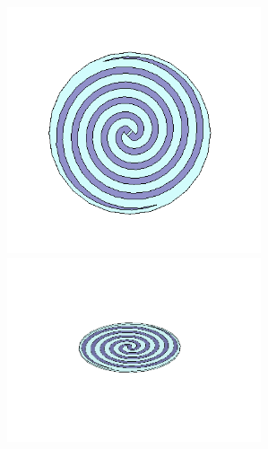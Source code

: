 \documentclass[11pt,a4paper,uplatex]{ujarticle}
\begin{document}
  \begin{figure}[tbp]
    \begin{minipage}[b]{0.495\textwidth}
      \centering
      \includegraphics[keepaspectratio, width=75mm]{Images/spiral_antenna_configuration.png}
    \end{minipage}
    \begin{minipage}[b]{0.495\textwidth}
      \centering
      \includegraphics[keepaspectratio, width=75mm]{Images/spiral_withoutcord.png}
    \end{minipage}
  \end{figure}
\end{document}
